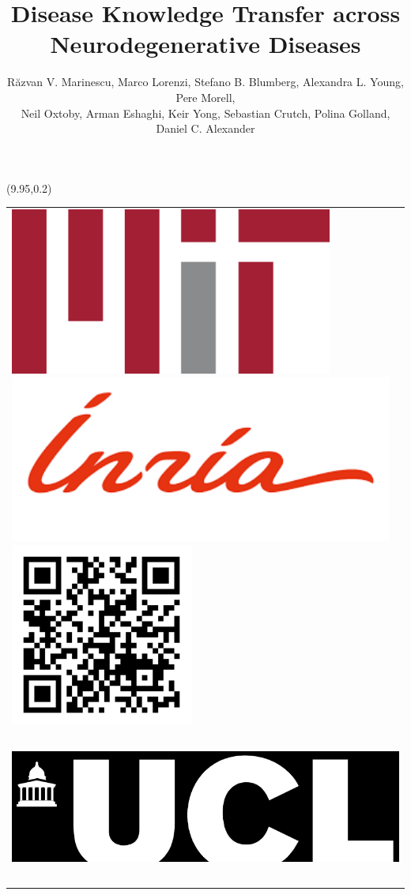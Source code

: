 \documentclass[portrait,a0,final,20pt]{a0poster}
\title{Disease Knowledge Transfer across Neurodegenerative Diseases}
\author{\LARGE{R\u{a}zvan V. Marinescu, Marco Lorenzi, Stefano B. Blumberg, Alexandra L. Young, Pere Morell},\\ \LARGE{Neil Oxtoby, Arman Eshaghi, Keir Yong, Sebastian Crutch, Polina Golland, Daniel C. Alexander}\\}
\begin{document}
\hspace{-1cm}	
\begin{minipage}{50cm}					%
\maketitle
\end{minipage}
\begin{textblock}{0}(9.95,0.2)
\begin{tabular}{l}
\includegraphics[height=5.5cm]{mit_logo}\includegraphics[height=5.5cm]{inria_logo}\includegraphics[height=6cm]{qr_dkt.png}\\
\hspace{11.45cm}\includegraphics[height=5cm]{ucl_logo}\\
\end{tabular}


\end{textblock}
\end{document}

